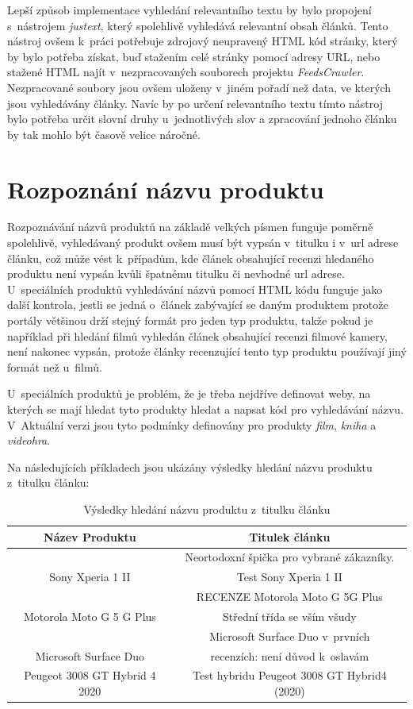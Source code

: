 Lepší způsob implementace vyhledání relevantního textu by bylo propojení s~nástrojem \textit{justext}, který spolehlivě vyhledává relevantní obsah článků. Tento nástroj ovšem k~práci potřebuje zdrojový neupravený HTML kód stránky, který by bylo potřeba získat, buď stažením celé stránky pomocí adresy URL, nebo stažené HTML najít v~nezpracovaných souborech projektu \textit{FeedsCrawler}. Nezpracované soubory jsou ovšem uloženy v~jiném pořadí než data, ve kterých jsou vyhledávány články. Navíc by po určení relevantního textu tímto nástroj bylo potřeba určit slovní druhy u~jednotlivých slov a zpracování jednoho článku by tak mohlo být časově velice náročné.

\section{Rozpoznání názvu produktu}

Rozpoznávání názvů produktů na základě velkých písmen funguje poměrně spolehlivě, vyhledávaný produkt ovšem musí být vypsán v~titulku i v~url adrese článku, což může vést k~případům, kde článek obsahující recenzi hledaného produktu není vypsán kvůli špatnému titulku či nevhodné url adrese. U~speciálních produktů vyhledávání názvů pomocí HTML kódu funguje jako další kontrola, jestli se jedná o~článek zabývající se daným produktem protože portály většinou drží stejný formát pro jeden typ produktu, takže pokud je například při hledání filmů vyhledán článek obsahující recenzi filmové kamery, není nakonec vypsán, protože články recenzující tento typ produktu používají jiný formát než u~filmů.

U~speciálních produktů je problém, že je třeba nejdříve definovat weby, na kterých se mají hledat tyto produkty hledat a napsat kód pro vyhledávání názvu. V~Aktuální verzi jsou tyto podmínky definovány pro produkty \textit{film}, \textit{kniha} a \textit{videohra}.

Na následujících příkladech jsou ukázány výsledky hledání názvu produktu z~titulku článku:

\begin{table}[h]
    \centering
    \begin{tabular}{|c|c|}
        \hline
        Název Produktu & Titulek článku\\
        \hline\hline
        & Neortodoxní špička pro vybrané zákazníky. \\
        Sony Xperia 1 II & Test Sony Xperia 1 II \\
        \hline
         & RECENZE Motorola Moto G 5G Plus \\
        Motorola Moto G 5 G Plus & Střední třída se vším všudy \\
        \hline
         & Microsoft Surface Duo v~prvních \\
        Microsoft Surface Duo & recenzích: není důvod k~oslavám \\
        \hline
        Peugeot 3008 GT Hybrid 4 2020  & Test hybridu Peugeot 3008 GT Hybrid4 (2020) \\
        \hline
    \end{tabular}
    \caption{Výsledky hledání názvu produktu z~titulku článku}
    \label{tab:nazev_z_titulku}
\end{table}

